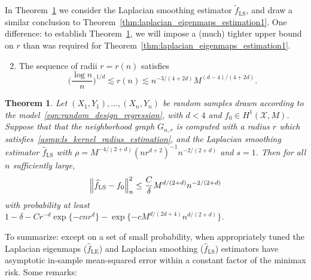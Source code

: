 \documentclass{article}
\newcommand{\1}{\mathbf{1}}
\newcommand{\Xset}{\mathcal{X}}
\newcommand{\wt}[1]{\widetilde{#1}}
\newcommand{\wh}[1]{\widehat{#1}}
\newcommand{\LE}{\mathrm{LE}}
\newcommand{\LS}{\mathrm{LS}}
\theoremstyle{alden}
\theoremstyle{aldenthm}
\newtheorem{theorem}{Theorem}
\theoremstyle{definition}
\theoremstyle{remark}
\begin{document}
In Theorem~\ref{thm:laplacian_smoothing_estimation1} we consider the Laplacian smoothing estimator $\wt{f}_{\LS}$, and draw a similar conclusion to Theorem~\ref{thm:laplacian_eigenmaps_estimation1}. One difference: to establish Theorem~\ref{thm:laplacian_smoothing_estimation1}, we will impose a (much) tighter upper bound on $r$ than was required for Theorem~\ref{thm:laplacian_eigenmaps_estimation1}.
\begin{enumerate}[label=(R\arabic*)]
	\setcounter{enumi}{1}
	\item 
	\label{asmp:ls_kernel_radius_estimation}
	The sequence of radii $r = r(n)$ satisfies
	\begin{equation*}
	\biggl(\frac{\log n}{n}\biggr)^{1/d} \lesssim r(n) \lesssim n^{-3/(4 + 2d)} M^{(d - 4)/(4 + 2d)}.
	\end{equation*}
\end{enumerate}
\begin{theorem}
	\label{thm:laplacian_smoothing_estimation1}
	Let $(X_1,Y_1),\ldots,(X_n,Y_n)$ be random samples drawn according to the model~\eqref{eqn:random_design_regression}, with $d < 4$ and $f_0 \in H^1(\Xset,M)$. Suppose that that the neighborhood graph $G_{n,r}$ is computed with a radius $r$ which satisfies~\ref{asmp:ls_kernel_radius_estimation},  and the Laplacian smoothing estimator $\wh{f}_{\LS}$ with $\rho = M^{-4/(2 + d)} (nr^{d + 2})^{-1} n^{-2/(2 + d)}$ and $s = 1$. Then for all $n$ sufficiently large,
	\begin{equation*}
	\Bigl\|\wh{f}_{\LS} - f_0\Bigr\|_n^2 \leq \frac{C}{\delta} M^{d/(2 + d)} n^{-2/(2 + d)}
	\end{equation*}
	with probability at least $1 - \delta -  Cr^{-d}\exp\{-cnr^d\} - \exp\{-c M^{d/(2d + 4)} n^{d/(2+d)}\}$.
\end{theorem}
To summarize: except on a set of small probability, when appropriately tuned the Laplacian eigenmaps ($\wh{f}_{\LE}$) and Laplacian smoothing ($\wh{f}_{\LS}$) estimators have asymptotic in-sample mean-squared error within a constant factor of the minimax risk. Some remarks:
\end{document}
